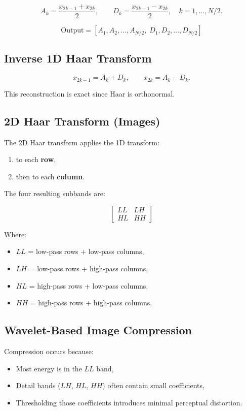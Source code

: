 \documentclass{AnantDocumentation}
\begin{document}
\[
A_k = \frac{x_{2k-1} + x_{2k}}{2},
\qquad
D_k = \frac{x_{2k-1} - x_{2k}}{2},
\quad k = 1,\ldots,N/2.
\]

\[
\text{Output} = [A_1, A_2, \ldots, A_{N/2},\; D_1, D_2, \ldots, D_{N/2}]
\]

\subsection{Inverse 1D Haar Transform}

\[
x_{2k-1} = A_k + D_k,
\qquad
x_{2k} = A_k - D_k.
\]

This reconstruction is exact since Haar is orthonormal.

\subsection{2D Haar Transform (Images)}

The 2D Haar transform applies the 1D transform:

\begin{enumerate}
\item to each \textbf{row},
\item then to each \textbf{column}.
\end{enumerate}

The four resulting subbands are:

\[
\begin{bmatrix}
LL & LH \\
HL & HH
\end{bmatrix}
\]

Where:

\begin{itemize}
\item $LL$ = low-pass rows + low-pass columns,
\item $LH$ = low-pass rows + high-pass columns,
\item $HL$ = high-pass rows + low-pass columns,
\item $HH$ = high-pass rows + high-pass columns.
\end{itemize}

\subsection{Wavelet-Based Image Compression}

Compression occurs because:

\begin{itemize}
\item Most energy is in the $LL$ band,
\item Detail bands ($LH$, $HL$, $HH$) often contain small coefficients,
\item Thresholding those coefficients introduces minimal perceptual distortion.
\end{itemize}
\end{document}

